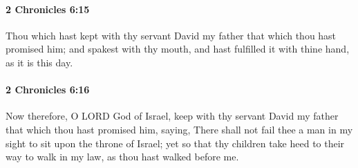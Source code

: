 		\paragraph{2 Chronicles 6:15} %
			\label{2CHRONICLES-6-15}

			Thou which hast kept with thy servant David my father that which thou hast promised him; and spakest with thy mouth, and hast fulfilled it with thine hand, as it is this day.


		\paragraph{2 Chronicles 6:16} %
			\label{2CHRONICLES-6-16}

			Now therefore, O LORD God of Israel, keep with thy servant David my father that which thou hast promised him, saying, There shall not fail thee a man in my sight to sit upon the throne of Israel; yet so that thy children take heed to their way to walk in my law, as thou hast walked before me.

